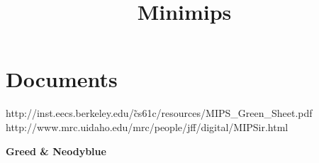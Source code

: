 \documentclass[11pt,a4paper]{article}
\title {Minimips}
\begin{document}
		






\section{Documents}

http://inst.eecs.berkeley.edu/\~cs61c/resources/MIPS\_Green\_Sheet.pdf\\
\indent http://www.mrc.uidaho.edu/mrc/people/jff/digital/MIPSir.html
\begin{center}
    \textbf{Greed \& Neodyblue}
\end{center}
\end{document}
